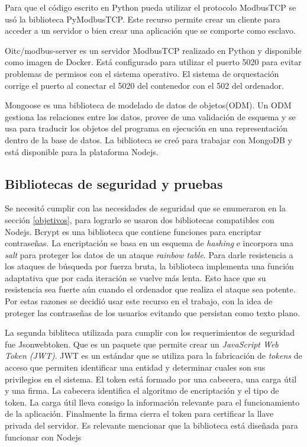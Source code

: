 Para que el código escrito en Python pueda utilizar el protocolo ModbusTCP se usó la biblioteca PyModbusTCP.
Este recurso permite crear un cliente para acceder a un servidor o bien crear una aplicación que se comporte como esclavo.

Oitc/modbus-server es un servidor ModbusTCP realizado en Python y disponible como imagen de Docker.
Está configurado para utilizar el puerto 5020 para evitar problemas de permisos con el sistema operativo. \citep{WEBSITE:dockerhubModbus}
El sistema de orquestación corrige el puerto al conectar el 5020 del contenedor con el 502 del ordenador.

Mongoose es una biblioteca de modelado de datos de objetos(ODM).
Un ODM gestiona las relaciones entre los datos, provee de una validación de esquema y se usa para traducir los objetos del programa en ejecución en una representación dentro de la base de datos.
La biblioteca se creó para trabajar con MongoDB y está disponible para la plataforma Nodejs.

\subsection{Bibliotecas de seguridad y pruebas}
Se necesitó cumplir con las necesidades de seguridad que se enumeraron en la sección \ref{objetivos}, para lograrlo se usaron dos bibliotecas compatibles con Nodejs.
Bcrypt es una biblioteca que contiene funciones para encriptar contraseñas.
La encriptación se basa en un esquema de \emph{hashing} e incorpora una \emph{salt} para proteger los datos de un ataque \emph{rainbow table}.
Para darle resistencia a los ataques de búsqueda por fuerza bruta, la biblioteca implementa una función adaptativa que por cada iteración se vuelve más lenta.
Esto hace que su resistencia sea fuerte aún cuando el ordenador que realiza el ataque sea potente.
Por estas razones se decidió usar este recurso en el trabajo, con la idea de proteger las contraseñas de los usuarios evitando que persistan como texto plano.

La segunda bibliteca utilizada para cumplir con los requerimientos de seguridad fue Jsonwebtoken.
Que es un paquete que permite crear un \emph{JavaScript Web Token (JWT)}.
JWT es un estándar que se utiliza para la fabricación de \emph{tokens} de acceso que permiten identificar una entidad y determinar cuales son sus privilegios en el sistema.
El token está formado por una cabecera, una carga útil y una firma.
La cabecera identifica el algoritmo de encriptación y el tipo de token.
La carga útil lleva consigo la información relevante para el funcionamiento de la aplicación.
Finalmente la firma cierra el token para certificar la llave privada del servidor.
Es relevante mencionar que la biblioteca está diseñada para funcionar con Nodejs

